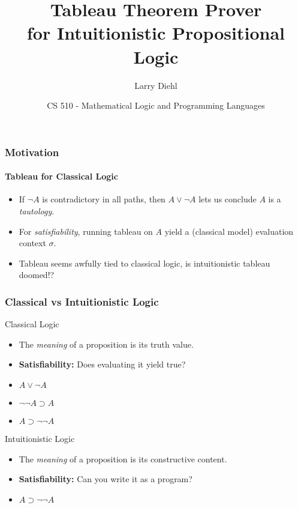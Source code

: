 \documentclass[mathserif]{beamer}
\title{Tableau Theorem Prover\\ for Intuitionistic Propositional Logic}
\author{Larry Diehl}
\institute{Portland State University}
\date[Fall 2014]
{CS 510 - Mathematical Logic and Programming Languages}
\def\imp{\supset}
\begin{document}
\frame{\titlepage}

\begin{frame}
\frametitle{Motivation}
\framesubtitle{Tableau for Classical Logic}

\begin{itemize}
\item If $\neg A$ is contradictory in all paths, then $A \lor \neg A$
  lets us conclude $A$ is a {\it tautology}.
\item For {\it satisfiability}, running tableau on $A$ yield a
  (classical model) evaluation context $\sigma$.
\item Tableau seems awfully tied to classical logic, is intuitionistic
  tableau doomed!?
\end{itemize}



\end{frame}


\begin{frame}
\frametitle{Classical vs Intuitionistic Logic}

\begin{block}{Classical Logic}
\begin{itemize}
\item The {\it meaning} of a proposition is its truth value.
\item {\bf Satisfiability:} Does evaluating it yield true?
\item $A \lor \neg A$
\item $\neg\neg A \imp A$
\item $A \imp \neg\neg A$
\end{itemize}
\end{block}

\begin{block}{Intuitionistic Logic}
\begin{itemize}
\item The {\it meaning} of a proposition is its constructive content.
\item {\bf Satisfiability:} Can you write it as a program?
\item $A \imp \neg\neg A$
\end{itemize}
\end{block}

\end{frame}
\end{document}
